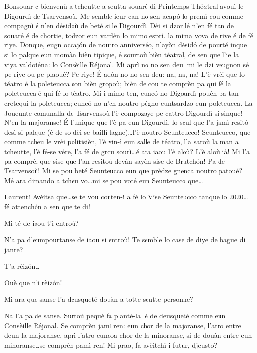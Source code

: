 \begin{drama}

\Laurentspeaks Bonsouar é bienvenù a tcheutte a seutta souaré di Printemps Thé$\hat{a}$tral avouì le Digourdì de Tsarvensoù. Me semble ieur can no sen acapó lo premì cou comme compagnì é n'en désidoù de beté si le Digourdì. Dèi si dzor lé n'en fé tan de souaré é de chortie, todzor eun vardèn lo mimo esprì, la mima voya de riye é de fé riye. Donque, eugn occajón de noutro anniverséo, n’ayòn désidó de pourté inque si lo palque eun momàn bièn tipique, é sourtoù bièn téatral, de sen que l'ie la viya valdoténa: lo Consèille Réjonal. Mi aprì no no sen deu: mi le dzi veugnon sé pe riye ou pe plaoué? Pe riye! É ad\'on no no sen deu: na, na, na! L'è vrèi que lo téatro é la poleteucca son bièn gropoù; bièn de cou te comprèn pa qui fé la poleteucca é qui fé lo téatro. Mi i mimo ten, euncó no Digourdì pouèn pa tan cretequì la poleteucca; euncó no n'en noutro pégno euntsardzo eun poleteucca. La Joueunte comunalla de Tsarvensoù l'è compozaye pe cattro Digourdì si sinque! N'en la majoranse! \'E l'unique que l'è pa eun Digourdì, lo seul que l'a jamì resitó desì si palque (é de so dèi se baillì lagne)\ldots l'è noutro Seunteucco! Seunteucco, que comme tcheu le vrèi politisièn, l'è vin-ì eun salle de téatro, l'a saroù la man a tcheutte, l'è fé-se vére, l'a fé de grou sourì\ldots é ara iaou l'è aloù? L'è aloù ià! Mi l'a pa comprèi que sise que l'an resitoù devàn sayòn sise de Brutchón! Pa de Tsarvensoù! Mi se pou beté Seunteucco eun que prèdze gnenca noutro patoué? Mé ara dimando a tcheu vo\ldots mi se pou voté eun Seunteucco que\ldots


\Ronnyspeaks Laurent! Avèitsa que\ldots se te vou conten-ì a fé lo Vise Seunteucco tanque lo 2020\ldots fé attench\'on a sen que te di!

\Laurentspeaks Mi té de iaou t’i entroù?

\Ronnyspeaks N'a pa d'eumpourtanse de iaou si entroù! Te semble lo case  de diye de bague di janre?

\Laurentspeaks T'a rèiz\'on\ldots

\Ronnyspeaks Ouè que n'i rèiz\'on!

\Laurentspeaks Mi ara que sanse l'a deusqueté douàn a totte seutte personne?

\Ronnyspeaks Na l'a pa de sanse. Surtoù pequé fa planté-la lé de deusqueté comme eun Consèille Réjonal. Se comprèn jamì ren: eun chor de la majoranse, l'atro entre deun la majoranse, aprì l'atro euncoa chor de la minoranse, si de douàn entre eun minoranse\ldots se comprèn pamì ren! Mi prao, fa avèitchì i futur, djeusto?


\end{drama}
